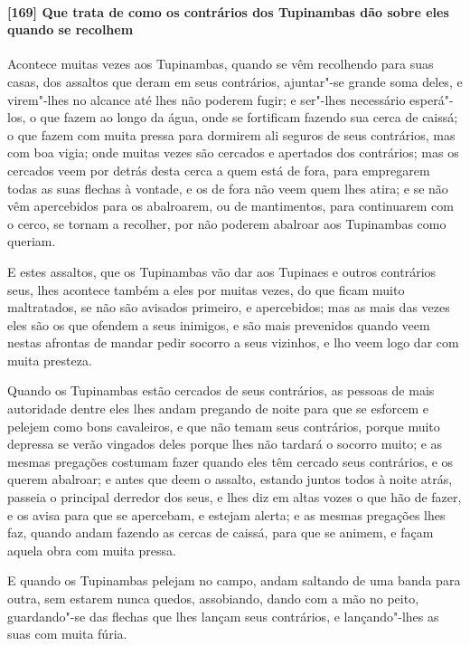 \begin{linenumbers}
\paragraph{[169] Que trata de como os contrários dos Tupinambas dão sobre eles quando se
recolhem}\quad
Acontece muitas vezes aos Tupinambas, quando se vêm recolhendo para suas casas, dos
assaltos que deram em seus contrários, ajuntar"-se grande soma deles, e virem"-lhes no
alcance até lhes não poderem fugir; e ser"-lhes necessário esperá"-los, o que fazem ao longo
da água, onde se fortificam fazendo sua cerca de caissá; o que fazem com muita pressa para
dormirem ali seguros de seus contrários, mas com boa vigia; onde muitas vezes são cercados
e apertados dos contrários; mas os cercados veem por detrás desta cerca a quem está de
fora, para empregarem todas as suas flechas à vontade, e os de fora não veem quem lhes
atira; e se não vêm apercebidos para os abalroarem, ou de mantimentos, para continuarem
com o cerco, se tornam a recolher, por não poderem abalroar aos Tupinambas como queriam.

E estes assaltos, que os Tupinambas vão dar aos Tupinaes e outros contrários seus, lhes
acontece também a eles por muitas vezes, do que ficam muito maltratados, se não são
avisados primeiro, e apercebidos; mas as mais das vezes eles são os que ofendem a seus
inimigos, e são mais prevenidos quando veem nestas afrontas de mandar pedir socorro a seus
vizinhos, e lho veem logo dar com muita presteza.

Quando os Tupinambas estão cercados de seus contrários, as pessoas de mais autoridade
dentre eles lhes andam pregando de noite para que se esforcem e pelejem como bons
cavaleiros, e que não temam seus contrários, porque muito depressa se verão vingados deles
porque lhes não tardará o socorro muito; e as mesmas pregações costumam fazer quando eles
têm cercado seus contrários, e os querem abalroar; e antes que deem o assalto, estando
juntos todos à noite atrás, passeia o principal derredor dos seus, e lhes diz em altas
vozes o que hão de fazer, e os avisa para que se apercebam, e estejam alerta; e as mesmas
pregações lhes faz, quando andam fazendo as cercas de caissá, para que se animem, e façam
aquela obra com muita pressa.

E quando os Tupinambas pelejam no campo, andam saltando de uma banda para outra, sem
estarem nunca quedos, assobiando, dando com a mão no peito, guardando"-se das flechas que
lhes lançam seus contrários, e lançando"-lhes as suas com muita fúria.


\end{linenumbers}
